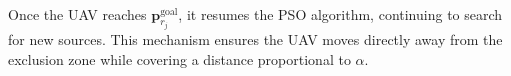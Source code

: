 \documentclass[main]{subfiles}
\begin{document}
\noindent\\
Once the UAV reaches \( \mathbf{p}_{r_j}^{\text{goal}} \), 
it resumes the PSO algorithm, continuing to search for new sources. 
This mechanism ensures the UAV moves directly away from the 
exclusion zone while covering a distance proportional to \( \alpha \).






\end{document}
